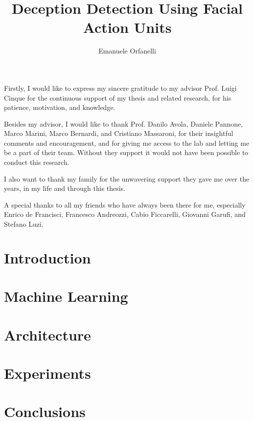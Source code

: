 \documentclass[LaM,binding=0.6cm,english,noexaminfo]{sapthesis}
\title{Deception Detection Using Facial Action Units}
\author{Emanuele Orfanelli}
\begin{document}
\frontmatter

\maketitle

\dedication{Dedicated to\\ my Family and Friends}

\begin{acknowledgments}
Firstly, I would like to express my sincere gratitude to my advisor Prof. Luigi Cinque for the continuous support of my thesis and related research, for his patience, motivation, and knowledge. 

Besides my advisor, I would like to thank Prof. Danilo Avola, Daniele Pannone, Marco Marini, Marco Bernardi, and Cristiano Massaroni, for their insightful comments and encouragement, and for giving me access to the lab and letting me be a part of their team. Without they support it would not have been possible to conduct this research.

I also want to thank my family for the unwavering support they gave me over the years, in my life and through this thesis.

A special thanks to all my friends who have always been there for me, especially Enrico de Francisci, Francesco Andreozzi, Cabio Ficcarelli, Giovanni Garufi, and Stefano Luzi.
\end{acknowledgments}

\tableofcontents



\mainmatter

\chapter{Introduction}


\chapter{Machine Learning} \label{tit:ml}


\chapter{Architecture} \label{tit:archi}


\chapter{Experiments} \label{tit:exp}


\chapter{Conclusions}  \label{tit:concl}


\backmatter

\printbibliography

\listoffigures

\cleardoublepage
\end{document}
